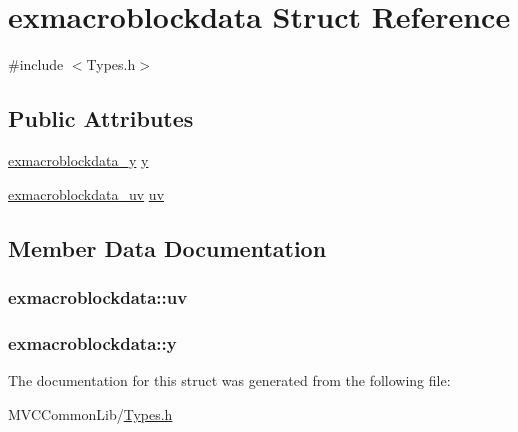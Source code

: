 \hypertarget{structexmacroblockdata}{
\section{exmacroblockdata Struct Reference}
\label{structexmacroblockdata}
}


{\ttfamily \#include $<$Types.h$>$}

\subsection*{Public Attributes}
\begin{DoxyCompactItemize}
\item 
\hyperlink{_types_8h_a0f66eed76a4d7c1c98b92eb97caf0186}{exmacroblockdata\_\-y} \hyperlink{structexmacroblockdata_a1a0e62951bdb79d51731b73601701cba}{y}
\item 
\hyperlink{_types_8h_a76c3a1d0417486239b5034c010e36ece}{exmacroblockdata\_\-uv} \hyperlink{structexmacroblockdata_aeb6134d7ce9eb3883acb9858d303f475}{uv}
\end{DoxyCompactItemize}


\subsection{Member Data Documentation}
\hypertarget{structexmacroblockdata_aeb6134d7ce9eb3883acb9858d303f475}{
\subsubsection[{uv}]{ {\bf exmacroblockdata::uv}}}
\label{structexmacroblockdata_aeb6134d7ce9eb3883acb9858d303f475}
\hypertarget{structexmacroblockdata_a1a0e62951bdb79d51731b73601701cba}{
\subsubsection[{y}]{ {\bf exmacroblockdata::y}}}
\label{structexmacroblockdata_a1a0e62951bdb79d51731b73601701cba}


The documentation for this struct was generated from the following file:\begin{DoxyCompactItemize}
\item 
MVCCommonLib/\hyperlink{_types_8h}{Types.h}\end{DoxyCompactItemize}
